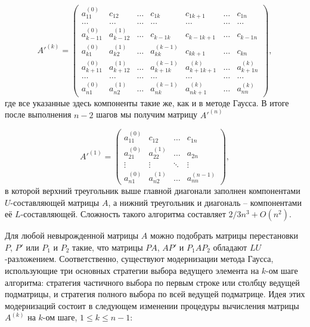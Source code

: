\[
A'^{ (k) } = 
	\begin{pmatrix}
		
		a_{11}^{ (0) }   & c_{12}			& \hdots & c_{1k}             & c_{1k+1}   & \hdots & c_{1n}                 \\
		\hdots           & \hdots           & \hdots & \hdots             & \hdots     & \hdots & \hdots                 \\
		a_{k-11}^{ (0) } & a_{k-12}^{ (1) } & \hdots & c_{k-1k}           & c_{k-1k+1} & \hdots & c_{k-1n}               \\
		a_{ k1 }^{ (0) } & a_{k2}^{ (1) }   & \hdots & a_{kk}^{ (k-1) }   & c_{kk+1}   & \hdots & c_{kn}                 \\
		a_{k+11}^{ (0) } & a_{k+12}^{ (1) } & \hdots & a_{k+1k}^{ (k-1) } & a_{k+1k+1}^{ (k) } & \hdots & a_{k+1n}^{(k)} \\
		\hdots           & \hdots           & \hdots & \hdots             & \hdots     & \hdots & \hdots                 \\
		a_{n1}^{ (0) }  & a_{n2}^{ (1) }    & \hdots & a_{nk}^{ (k-1) }   & a_{ nk+1 }^{ (k) } & \hdots & a_{nn}^{ (k) }       
		
	\end{pmatrix},
\]
где все указанные здесь компоненты такие же, как и в методе Гаусса. В итоге после выполнения $n-2$ шагов мы получим матрицу $A'^{(n)}$

\[
A'^{ (1) } = 
	\begin{pmatrix}
		a_{11}^{ (0) } & c_{12}			& \hdots & c_{1n}			\\
		a_{21}^{ (0) } & a_{22}^{ (1) } & \hdots & a_{2n}			\\
		\vdots		   & \vdots			& \ddots & \vdots			\\
		a_{n1}^{ (0) } & a_{n2}^{ (1) } & \hdots & a_{nn}^{ (n-1) } 	
	\end{pmatrix},
\] 
в которой верхний треугольник выше главной диагонали заполнен компонентами $U$-составляющей матрицы $A$, а нижний треугольник и диагональ – компонентами её $L$-составляющей. Сложность такого алгоритма составляет $2/3n^3 + O(n^2)$.


Для любой невырожденной  матрицы $A$ можно подобрать матрицы перестановки $P$, $P'$ или $P_1$ и $P_2$ такие, что матрицы $PA$, $AP'$ и $P_1 A P_2$ обладают $LU$-разложением. Соответственно, существуют модернизации метода Гаусса, использующие три основных стратегии выбора ведущего элемента на $k$-ом шаге алгоритма: стратегия частичного выбора по первым строке или столбцу ведущей подматрицы, и стратегия полного выбора по всей ведущей подматрице. Идея этих модернизаций состоит в следующем изменении процедуры вычисления матрицы $A^{(k)}$ на $k$-ом шаге, $1 \leq k \leq n - 1$:

